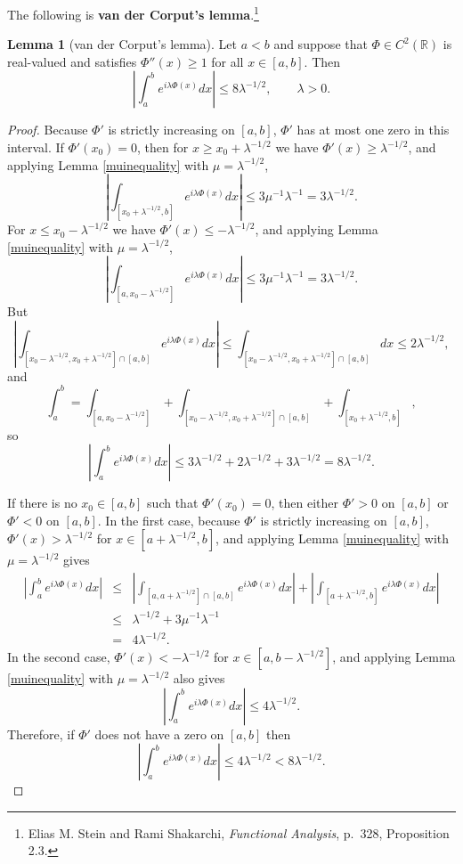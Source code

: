 \documentclass{article}
\theoremstyle{definition}
\newtheorem{lemma}[theorem]{Lemma}
\theoremstyle{definition}
\begin{document}
The following is \textbf{van der Corput's lemma}.\footnote{Elias M. Stein and Rami Shakarchi, {\em Functional Analysis}, p.~328, Proposition 2.3.}

\begin{lemma}[van der Corput's lemma]
Let $a<b$ and suppose that $\Phi \in C^2(\mathbb{R})$ is real-valued and satisfies $\Phi''(x) \geq 1$ for all $x \in [a,b]$.  Then
\[
\left| \int_a^b e^{i\lambda \Phi(x)} dx\right|  \leq 8 \lambda^{-1/2}, \qquad \lambda>0.
\]
\label{vandercorput}
\end{lemma}
\begin{proof}
Because $\Phi'$ is strictly increasing on $[a,b]$, $\Phi'$ has at most one zero in this interval.
If $\Phi'(x_0)=0$, then for $x \geq x_0+ \lambda^{-1/2}$ we have
$\Phi'(x) \geq \lambda^{-1/2}$, and  applying Lemma \ref{muinequality} with $\mu=\lambda^{-1/2}$,
\[
\left| \int_{[x_0+\lambda^{-1/2},b]} e^{i\lambda \Phi(x)} dx \right| \leq 3\mu^{-1} \lambda^{-1} = 3\lambda^{-1/2}.
\]
For $x \leq x_0-\lambda^{-1/2}$ we have $\Phi'(x) \leq - \lambda^{-1/2}$, and  applying Lemma \ref{muinequality} with $\mu=\lambda^{-1/2}$,
\[
\left| \int_{[a,x_0-\lambda^{-1/2}]} e^{i\lambda \Phi(x)} dx \right| \leq 3\mu^{-1} \lambda^{-1} = 3\lambda^{-1/2}.
\]
But
\[
\left| \int_{[x_0-\lambda^{-1/2},x_0+\lambda^{-1/2}] \cap [a,b]} e^{i\lambda \Phi(x)} dx \right| \leq  \int_{[x_0-\lambda^{-1/2},x_0+\lambda^{-1/2}] \cap [a,b]}  dx \leq
2\lambda^{-1/2},
\]
and
\[
\int_a^b = \int_{[a,x_0-\lambda^{-1/2}]} +  \int_{[x_0-\lambda^{-1/2},x_0+\lambda^{-1/2}] \cap [a,b]} +  \int_{[x_0+\lambda^{-1/2},b]},
\]
so 
\[
\left| \int_a^b e^{i\lambda \Phi(x)} dx\right| \leq 3\lambda^{-1/2}+2\lambda^{-1/2}+3\lambda^{-1/2}= 8\lambda^{-1/2}.
\]

If there is no $x_0 \in [a,b]$ such that $\Phi'(x_0)=0$, then either $\Phi'>0$ on $[a,b]$ or $\Phi'<0$ on $[a,b]$. In the first case, 
because $\Phi'$ is strictly increasing on $[a,b]$, $\Phi'(x) > \lambda^{-1/2}$ for 
$x \in [a+\lambda^{-1/2},b]$, and applying Lemma \ref{muinequality} with $\mu=\lambda^{-1/2}$ gives
\begin{eqnarray*}
\left| \int_a^b e^{i\lambda \Phi(x)} dx \right| 
&\leq& \left| \int_{[a,a+\lambda^{-1/2}] \cap [a,b]} e^{i\lambda \Phi(x)} dx \right|
+\left| \int_{[a+\lambda^{-1/2},b]} e^{i\lambda \Phi(x)} dx \right|\\
&\leq&\lambda^{-1/2} + 3\mu^{-1} \lambda^{-1}\\
&=&4\lambda^{-1/2}.
\end{eqnarray*}
In the second case, $\Phi'(x) < -\lambda^{-1/2}$ for $x \in [a,b-\lambda^{-1/2}]$, and applying Lemma
\ref{muinequality} with $\mu=\lambda^{-1/2}$ also gives
\[
\left| \int_a^b e^{i\lambda \Phi(x)} dx \right|  \leq 4 \lambda^{-1/2}.
\]
Therefore, if $\Phi'$ does not have a zero on $[a,b]$ then
\[
\left| \int_a^b e^{i\lambda \Phi(x)} dx \right|  \leq 4 \lambda^{-1/2} < 8\lambda^{-1/2}.
\]
\end{proof}
\end{document}
